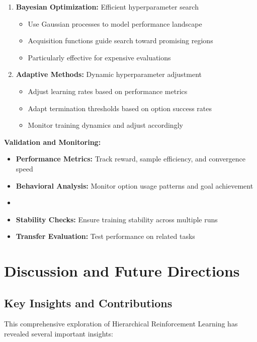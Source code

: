 \documentclass[12pt]{article}
\begin{document}
{{\begin{enumerate}
    \item \textbf{Bayesian Optimization:} Efficient hyperparameter search
    \begin{itemize}
        \item Use Gaussian processes to model performance landscape
        \item Acquisition functions guide search toward promising regions
        \item Particularly effective for expensive evaluations
    \end{itemize}
    
    \item \textbf{Adaptive Methods:} Dynamic hyperparameter adjustment
    \begin{itemize}
        \item Adjust learning rates based on performance metrics
        \item Adapt termination thresholds based on option success rates
        \item Monitor training dynamics and adjust accordingly
    \end{itemize}
\end{enumerate}

\textbf{Validation and Monitoring:}
\begin{itemize}
    \item \textbf{Performance Metrics:} Track reward, sample efficiency, and convergence speed
    \item \textbf{Behavioral Analysis:} Monitor option usage patterns and goal achievement
    \item \item \textbf{Stability Checks:} Ensure training stability across multiple runs
    \item \textbf{Transfer Evaluation:} Test performance on related tasks
\end{itemize}

\section{Discussion and Future Directions}

\subsection{Key Insights and Contributions}

This comprehensive exploration of Hierarchical Reinforcement Learning has revealed several important insights:

}}
\end{document}
